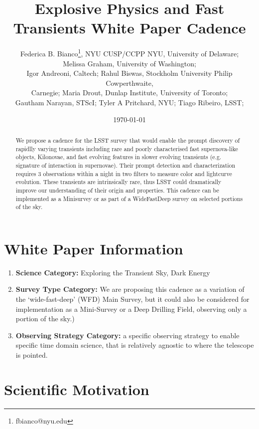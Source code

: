 \documentclass[11pt]{article}
\title{Explosive Physics and Fast Transients White Paper Cadence}
\author{\small{Federica B. Bianco\footnote{fbianco@nyu.edu}, NYU CUSP/CCPP NYU, University of Delaware;}\\\small{Melissa Graham, University of Washington;}\\\small{Igor Andreoni, Caltech; Rahul Biswas, Stockholm University Philip Cowperthwaite,}\\\small{Carnegie; Maria Drout, Dunlap Institute, University of Toronto;}\\\small{Gautham Narayan, STScI; Tyler A Pritchard, NYU; Tiago Ribeiro, LSST; 
}}
\date{\today}
\begin{document}
\maketitle

\begin{abstract}
We propose a cadence for the LSST survey that would enable the prompt discovery of rapidlly varying transients including rare and poorly characterised fast supernova-like objects, Kilonovae, and fast evolving features in slower evolving transients (e.g. signature of interaction in supernovae).  Their prompt detection and characterization requires 3 observations within a night in two filters to measure color and lightcurve evolution. These transients are intrinsically rare, thus LSST could dramatically improve our understanding of their origin and properties. This cadence can be implemented as a Minisurvey or as part of a WideFastDeep survey on selected portions of the sky.
\end{abstract}

\section{White Paper Information}
\begin{enumerate} 
\item {\bf Science Category:} Exploring the Transient Sky, Dark Energy
\item {\bf Survey Type Category:} 
We are proposing this cadence as a variation of the  `wide-fast-deep' (WFD) Main Survey, but it could also be considered for implementation as a Mini-Survey or a Deep Drilling Field, observing only a portion of the sky.) 
\item {\bf Observing Strategy Category:} 
   a specific observing strategy to enable specific time domain science, that is relatively agnostic to where the telescope is pointed. 
\end{enumerate}  


\clearpage
\section{Scientific Motivation}
\end{document}
